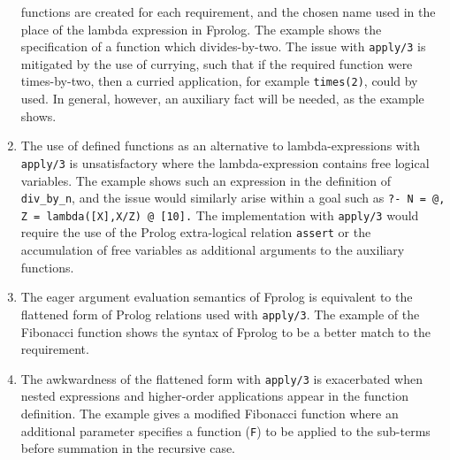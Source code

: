 \documentclass[a4paper,11pt,twoside]{article}
\begin{document}
\begin{enumerate}
{  functions are created for each requirement, and the chosen name used in the place
  of the lambda expression in Fprolog.  The example shows the specification of
  a function which divides-by-two.  The issue with \texttt{apply/3} is mitigated by
  the use of currying, such that if the required function were times-by-two, then
  a curried application, for example \texttt{times(2)}, could by used.
  In general, however,
  an auxiliary fact will be needed, as the example shows.}
\item{The use of defined functions as an alternative to lambda-expressions with
  \texttt{apply/3} is unsatisfactory where the lambda-expression contains free
  logical
  variables.  The example shows such an expression in the definition of
  \texttt{div\_{}by\_{}n}, and the issue would similarly arise within a goal
  such as \texttt{?- N = @, Z = lambda([X],X/Z) @ [10].}  The implementation with
  \texttt{apply/3} would require the use of the Prolog extra-logical relation
  \texttt{assert} or the accumulation of free variables as additional arguments to
  the auxiliary functions.}
\item{The eager argument evaluation semantics of Fprolog is equivalent to
  the flattened form of Prolog relations used with \texttt{apply/3}.  The
  example of the Fibonacci function shows the syntax of Fprolog to be a better
  match to the requirement.}
\enlargethispage{-2\baselineskip} %
\item{The awkwardness of the flattened form with \texttt{apply/3} is exacerbated
  when nested expressions and higher-order applications appear in the
  function definition.  The example gives a modified Fibonacci function where an
  additional parameter specifies a function (\texttt{F}) to be applied to the
  sub-terms before summation in the recursive case.

}
\end{enumerate}
\end{document}
